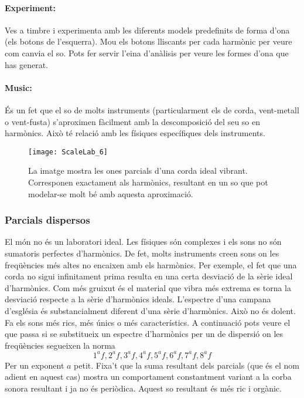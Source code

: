 \paragraph{Experiment:}
Ves a timbre i experimenta amb les diferents models predefinits de forma d'ona (els botons de l'esquerra). Mou els botons lliscants per cada harmònic per veure com canvia el so. Pots fer servir l'eina d'anàlisis per veure les formes d'ona que has generat.

\paragraph{Music:}
És un fet que el so de molts instruments (particularment els de corda, vent-metall o vent-fusta) s'aproximen fàcilment amb la descomposició del seu so en harmònics. Això té relació amb les físiques específiques dels instruments.

\begin{figure}
\centering
\texttt{[image: ScaleLab\_6]}
\caption*{La imatge mostra les ones parcials d'una corda ideal vibrant. Corresponen exactament als harmònics, resultant en un so que pot modelar-se molt bé amb aquesta aproximació.}
\end{figure}


\subsubsection{Parcials dispersos}
El món no és un laboratori ideal. Les físiques són complexes i els sons no són sumatoris perfectes d'harmònics. De fet, molts instruments creen sons on les freqüències més altes no encaixen amb els harmònics. Per exemple, el fet que una corda no sigui infinitament prima resulta en una certa desviació de la sèrie ideal d'harmònics. Com més gruixut és el material que vibra més extrema es torna la desviació respecte a la sèrie d'harmònics ideals. L'espectre d'una campana d'església és substancialment diferent  d'una sèrie d'harmònics. Això no és dolent. Fa els sons més rics, més únics o més característics. A continuació pots veure el que passa si se substitueix un espectre d'harmònics per un de dispersió on les freqüències segueixen la norma
$$1^af, 2^af, 3^af, 4^af, 5^af, 6^af, 7^af, 8^af$$
Per un exponent $a$ petit. Fixa't que la suma resultant dels parcials (que és el nom adient en aquest cas) mostra un comportament constantment variant a la corba sonora resultant i ja no és periòdica. Aquest so resultant és més ric i orgànic.

